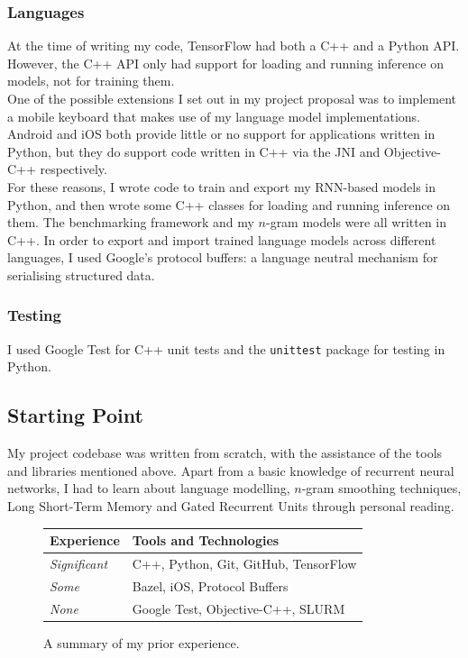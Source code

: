 \documentclass[a4paper, 12pt]{report}
\newcommand{\tbf}[1]{\textbf{#1}}
\newcommand{\ttt}[1]{\texttt{#1}}
\newcommand{\tit}[1]{\textit{#1}}
\begin{document}
\subsubsection{Languages}

At the time of writing my code, TensorFlow had both a C++ and a Python API. However, the C++ API only had support for loading and running inference on models, not for training them. \\

One of the possible extensions I set out in my project proposal was to implement a mobile keyboard that makes use of my language model implementations. Android and iOS both provide little or no support for applications written in Python, but they do support code written in C++ via the JNI and Objective-C++ respectively. \\

For these reasons, I wrote code to train and export my RNN-based models in Python, and then wrote some C++ classes for loading and running inference on them. The benchmarking framework and my $n$-gram models were all written in C++. In order to export and import trained language models across different languages, I used Google's protocol buffers: a language neutral mechanism for serialising structured data.

\subsubsection{Testing}

I used Google Test for C++ unit tests and the \ttt{unittest} package for testing in Python.

\subsection{Starting Point}

My project codebase was written from scratch, with the assistance of the tools and libraries mentioned above. Apart from a basic knowledge of recurrent neural networks, I had to learn about language modelling, $n$-gram smoothing techniques, Long Short-Term Memory and Gated Recurrent Units through personal reading. \\

\begin{figure}[h]
\captionsetup{justification=centering}
\centering
\begin{tabular}{| l | l |}
	\hline
	\tbf{Experience} & \tbf{Tools and Technologies} \\ \hline
	\tit{Significant} & C++, Python, Git, GitHub, TensorFlow \\
	\tit{Some} & Bazel, iOS, Protocol Buffers \\
	\tit{None} & Google Test, Objective-C++, SLURM \\ \hline
\end{tabular}
\caption{A summary of my prior experience.}
\end{figure}
\end{document}
